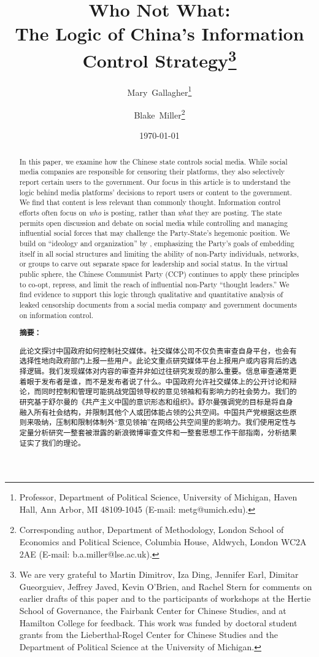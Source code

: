 \documentclass[12pt]{article}
\title{Who Not What: \\ \large The Logic of China's Information Control Strategy\thanks{We are very grateful to Martin Dimitrov, Iza Ding, Jennifer Earl, Dimitar Gueorguiev, Jeffrey Javed, Kevin O'Brien, and Rachel Stern for comments on earlier drafts of this paper and to the participants of workshops at the Hertie School of Governance, the Fairbank Center for Chinese Studies, and at Hamilton College for feedback. This work was funded by doctoral student grants from the Lieberthal-Rogel Center for Chinese Studies and the Department of Political Science at the University of Michigan.}}
\author{Mary\ Gallagher\thanks{\normalsize Professor, Department of Political Science, University of Michigan, Haven Hall, Ann Arbor, MI 48109-1045 (E-mail: \mbox{metg@umich.edu}).} \and Blake\ Miller\thanks{\normalsize Corresponding author,
    Department of Methodology, London School of Economics and Political Science, Columbia House, Aldwych, London WC2A 2AE (E-mail: \mbox{b.a.miller@lse.ac.uk}).}}
\date{\today\vspace{1em}\\}
\begin{document}
\begin{CJK*}{UTF8}{gbsn}
\maketitle\vspace{-2em}
{
\begin{abstract}
In this paper, we examine how the Chinese state controls social media. While social media companies are responsible for censoring their platforms, they also selectively report certain users to the government. Our focus in this article is to understand the logic behind media platforms' decisions to report users or content to the government. We find that content is less relevant than commonly thought. Information control efforts often focus on {\it who} is posting, rather than {\it what} they are posting. The state permits open discussion and debate on social media while controlling and managing influential social forces that may challenge the Party-State's hegemonic position. We build on ``ideology and organization'' by \cite{schurmann1968ideology}, emphasizing the Party's goals of embedding itself in all social structures and limiting the ability of non-Party individuals, networks, or groups to carve out separate space for leadership and social status. In the virtual public sphere, the Chinese Communist Party (CCP) continues to apply these principles to co-opt, repress, and limit the reach of influential non-Party ``thought leaders.'' We find evidence to support this logic through qualitative and quantitative analysis of leaked censorship documents from a social media company and government documents on information control.\\

\begin{center}
    {\bf 摘要：}
\end{center}

此论文探讨中国政府如何控制社交媒体。社交媒体公司不仅负责审查自身平台，也会有选择性地向政府部门上报一些用户。此论文重点研究媒体平台上报用户或内容背后的选择逻辑。我们发现媒体对内容的审查并非如过往研究发现的那么重要。信息审查通常更着眼于发布者是谁，而不是发布者说了什么。中国政府允许社交媒体上的公开讨论和辩论，而同时控制和管理可能挑战党国领导权的意见领袖和有影响力的社会势力。我们的研究基于舒尔曼的《共产主义中国的意识形态和组织》。舒尔曼强调党的目标是将自身融入所有社会结构，并限制其他个人或团体能占领的公共空间。中国共产党根据这些原则来吸纳，压制和限制体制外“意见领袖”在网络公共空间里的影响力。我们使用定性与定量分析研究一整套被泄露的新浪微博审查文件和一整套思想工作干部指南，分析结果证实了我们的理论。\\


\end{abstract}}
\end{CJK*}
\end{document}
